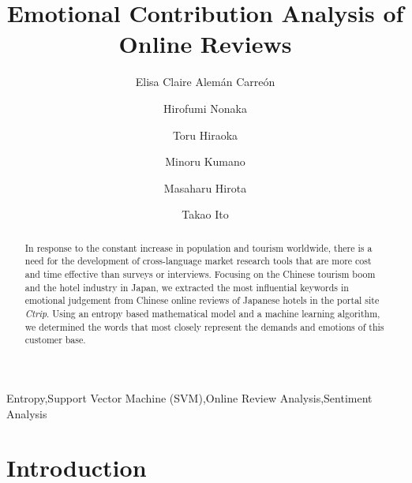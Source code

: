 \documentclass[review]{elsarticle}
\begin{document}
\begin{frontmatter}

\title{Emotional Contribution Analysis of Online Reviews}


\author[gidai]{Elisa Claire Alem\'an Carre\'on
}

\author[gidai]{Hirofumi Nonaka}

\author[nagasaki]{Toru Hiraoka}

\author[miyazaki]{Minoru Kumano}

\author[okayama]{Masaharu Hirota}

\author[hiroshima]{Takao Ito}

\address[gidai]{Nagaoka University of Technology, Nagaoka, Japan}
\address[miyazaki]{University of Miyazaki, Miyazaki, Japan}
\address[nagasaki]{University of Nagasaki, Nagasaki, Japan}
\address[okayama]{Okayama University of Science, Okayama, Japan}
\address[hiroshima]{Hiroshima University, Hiroshima, Japan}


\begin{abstract}

In response to the constant increase in population and tourism worldwide, there is a need for the development of cross-language market research tools that are more cost and time effective than surveys or interviews. Focusing on the Chinese tourism boom and the hotel industry in Japan, we extracted the most influential keywords in emotional judgement from Chinese online reviews of Japanese hotels in the portal site \textit{Ctrip}. Using an entropy based mathematical model and a machine learning algorithm, we determined the words that most closely represent the demands and emotions of this customer base. 

\end{abstract}

\begin{keyword}
Entropy\sep Support Vector Machine (SVM)\sep Online Review Analysis\sep Sentiment Analysis
\end{keyword}

\end{frontmatter}

\section{Introduction}\label{intro}
\end{document}
